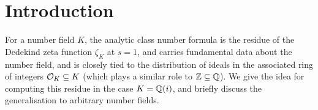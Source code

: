 \documentclass[11pt]{article}
\begin{document}
\section{Introduction}

For a number field $K$, the analytic class number formula is the residue of the Dedekind zeta function $\zeta_K$ at $s = 1$, and carries fundamental data about the number field, and is closely tied to the distribution of ideals in the associated ring of integers $\mathcal{O}_K \subseteq K$ (which plays a similar role to $\mathbb{Z} \subseteq \mathbb{Q}$). We give the idea for computing this residue in the case $K = \mathbb{Q}(i)$, and briefly discuss the generalisation to arbitrary number fields.
\end{document}
